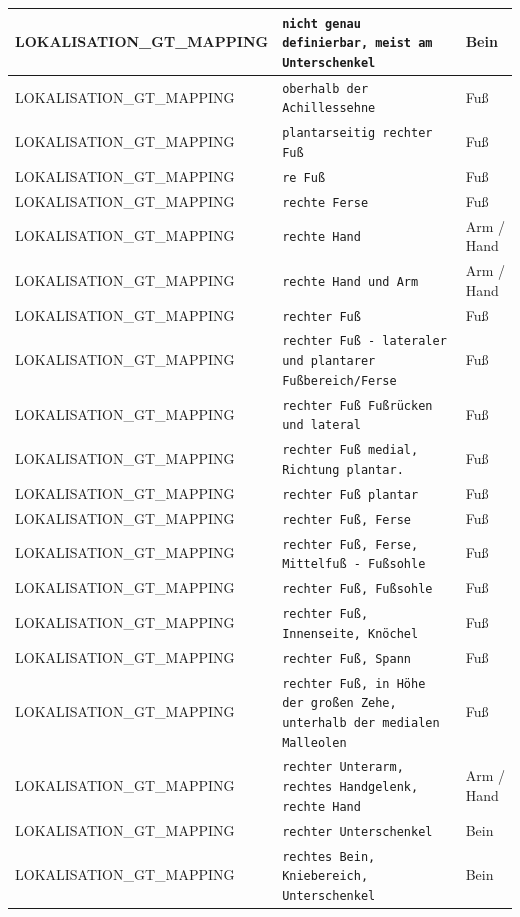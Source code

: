 \begin{longtable}{|p{3.5cm}|p{5cm}|p{6.5cm}|}
LOKALISATION\_GT\_MAPPING & \texttt{nicht genau definierbar, meist am Unterschenkel} & Bein \\ \hline
LOKALISATION\_GT\_MAPPING & \texttt{oberhalb der Achillessehne} & Fuß \\ \hline
LOKALISATION\_GT\_MAPPING & \texttt{plantarseitig rechter Fuß} & Fuß \\ \hline
LOKALISATION\_GT\_MAPPING & \texttt{re Fuß} & Fuß \\ \hline
LOKALISATION\_GT\_MAPPING & \texttt{rechte Ferse} & Fuß \\ \hline
LOKALISATION\_GT\_MAPPING & \texttt{rechte Hand} & Arm / Hand \\ \hline
LOKALISATION\_GT\_MAPPING & \texttt{rechte Hand und Arm} & Arm / Hand \\ \hline
LOKALISATION\_GT\_MAPPING & \texttt{rechter Fuß} & Fuß \\ \hline
LOKALISATION\_GT\_MAPPING & \texttt{rechter Fuß - lateraler und plantarer Fußbereich/Ferse} & Fuß \\ \hline
LOKALISATION\_GT\_MAPPING & \texttt{rechter Fuß Fußrücken und lateral} & Fuß \\ \hline
LOKALISATION\_GT\_MAPPING & \texttt{rechter Fuß medial, Richtung plantar.} & Fuß \\ \hline
LOKALISATION\_GT\_MAPPING & \texttt{rechter Fuß plantar} & Fuß \\ \hline
LOKALISATION\_GT\_MAPPING & \texttt{rechter Fuß, Ferse} & Fuß \\ \hline
LOKALISATION\_GT\_MAPPING & \texttt{rechter Fuß, Ferse, Mittelfuß - Fußsohle} & Fuß \\ \hline
LOKALISATION\_GT\_MAPPING & \texttt{rechter Fuß, Fußsohle} & Fuß \\ \hline
LOKALISATION\_GT\_MAPPING & \texttt{rechter Fuß, Innenseite, Knöchel} & Fuß \\ \hline
LOKALISATION\_GT\_MAPPING & \texttt{rechter Fuß, Spann} & Fuß \\ \hline
LOKALISATION\_GT\_MAPPING & \texttt{rechter Fuß, in Höhe der großen Zehe, unterhalb der medialen Malleolen} & Fuß \\ \hline
LOKALISATION\_GT\_MAPPING & \texttt{rechter Unterarm, rechtes Handgelenk, rechte Hand} & Arm / Hand \\ \hline
LOKALISATION\_GT\_MAPPING & \texttt{rechter Unterschenkel} & Bein \\ \hline
LOKALISATION\_GT\_MAPPING & \texttt{rechtes Bein, Kniebereich, Unterschenkel} & Bein \\ \hline

\end{longtable}

